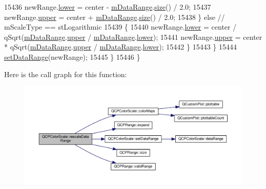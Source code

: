 \begin{DoxyCode}
15436         newRange.\hyperlink{class_q_c_p_range_aa3aca3edb14f7ca0c85d912647b91745}{lower} = center - \hyperlink{class_q_c_p_color_scale_a5d4853feb32cd0077bb2b871687c844b}{mDataRange}.\hyperlink{class_q_c_p_range_afa57c13049b965edb6fd1c00ac56338a}{size}() / 2.0;
15437         newRange.\hyperlink{class_q_c_p_range_ae44eb3aafe1d0e2ed34b499b6d2e074f}{upper} = center + \hyperlink{class_q_c_p_color_scale_a5d4853feb32cd0077bb2b871687c844b}{mDataRange}.\hyperlink{class_q_c_p_range_afa57c13049b965edb6fd1c00ac56338a}{size}() / 2.0;
15438       \} \textcolor{keywordflow}{else} \textcolor{comment}{// mScaleType == stLogarithmic}
15439       \{
15440         newRange.\hyperlink{class_q_c_p_range_aa3aca3edb14f7ca0c85d912647b91745}{lower} = center / qSqrt(\hyperlink{class_q_c_p_color_scale_a5d4853feb32cd0077bb2b871687c844b}{mDataRange}.\hyperlink{class_q_c_p_range_ae44eb3aafe1d0e2ed34b499b6d2e074f}{upper} / 
      \hyperlink{class_q_c_p_color_scale_a5d4853feb32cd0077bb2b871687c844b}{mDataRange}.\hyperlink{class_q_c_p_range_aa3aca3edb14f7ca0c85d912647b91745}{lower});
15441         newRange.\hyperlink{class_q_c_p_range_ae44eb3aafe1d0e2ed34b499b6d2e074f}{upper} = center * qSqrt(\hyperlink{class_q_c_p_color_scale_a5d4853feb32cd0077bb2b871687c844b}{mDataRange}.\hyperlink{class_q_c_p_range_ae44eb3aafe1d0e2ed34b499b6d2e074f}{upper} / 
      \hyperlink{class_q_c_p_color_scale_a5d4853feb32cd0077bb2b871687c844b}{mDataRange}.\hyperlink{class_q_c_p_range_aa3aca3edb14f7ca0c85d912647b91745}{lower});
15442       \}
15443     \}
15444     \hyperlink{class_q_c_p_color_scale_abe88633003a26d1e756aa74984587fef}{setDataRange}(newRange);
15445   \}
15446 \}
\end{DoxyCode}


Here is the call graph for this function\+:\nopagebreak
\begin{figure}[H]
\begin{center}
\leavevmode
\includegraphics[width=350pt]{class_q_c_p_color_scale_a425983db4478543924ddbd04ea20a356_cgraph}
\end{center}
\end{figure}


